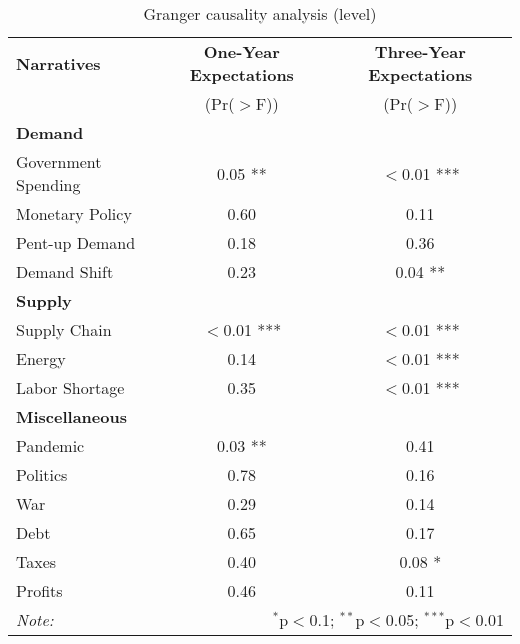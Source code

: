 \begin{table}[ht]
\centering
\caption{Granger causality analysis (level)}\label{table:granger}

\begin{tabular}{lcc}
\toprule
\textbf{Narratives} & \textbf{One-Year Expectations} & \textbf{Three-Year Expectations} \\
& (Pr($>$F)) & (Pr($>$F)) \\
\midrule
\multicolumn{3}{l}{\textbf{Demand}} \\
\midrule
Government Spending & 0.05 ** & $<$0.01 *** \\
Monetary Policy & 0.60 & 0.11 \\
Pent-up Demand & 0.18 & 0.36 \\
Demand Shift & 0.23 & 0.04 ** \\
\midrule
\multicolumn{3}{l}{\textbf{Supply}} \\
\midrule
Supply Chain & $<$0.01 *** & $<$0.01 *** \\
Energy & 0.14 & $<$0.01 *** \\
Labor Shortage & 0.35 & $<$0.01 *** \\
\midrule
\multicolumn{3}{l}{\textbf{Miscellaneous}} \\
\midrule
Pandemic & 0.03 ** & 0.41 \\
Politics & 0.78 & 0.16 \\
War & 0.29 & 0.14 \\
Debt & 0.65 & 0.17 \\
Taxes & 0.40 & 0.08 * \\
Profits & 0.46 & 0.11 \\
\midrule
\bottomrule
\textit{Note:}  & \multicolumn{2}{r}{$^{*}$p$<$0.1; $^{**}$p$<$0.05; $^{***}$p$<$0.01} \\
\bottomrule
\end{tabular}
\end{table}
